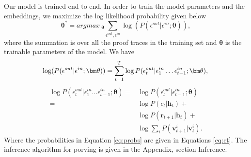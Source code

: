 Our model is trained end-to-end. In order to train the model parameters and the embeddings, we maximize the log likelihood probability given below
\begin{equation}
    {\bm \theta}^* = argmax~_{{\bm \theta}} \sum_{\epsilon^{out}, \epsilon^{in}} \log(P(\epsilon^{out} \vert \epsilon^{in};{\bm \theta})),
\end{equation}
where the summation is over all the proof traces in the training set and ${\bm \theta}$ is the trainable parameters of the model. We have
\begin{equation}
    \log(P(\epsilon^{out} \vert \epsilon^{in};{\bm \theta})) = \sum_{t=1}^T \log P(\epsilon^{out}_t \vert \epsilon^{in}_1 \dots \epsilon^{in}_{t-1}; {\bm \theta}), \\
\end{equation}
\begin{align}
    \log P(\epsilon^{out}_t \vert \epsilon^{in}_1 \dots \epsilon^{in}_{t-1}; {\bm \theta}) = & \log P(\epsilon^{out}_t \vert \epsilon^{in}_{t-1}; {\bm \theta}) \nonumber \\ 
     = & \log P(c_{t}\vert \mathbf{h}_t) +  \label{eq:probs}  \nonumber \\
     & \log P(\mathbf{r}_{t+1}\vert \mathbf{h}_t) + \nonumber \\
     & \log \sum_{i} P(\mathbf{v}^i_{t+1}\vert \mathbf{v}^i_t).
\end{align} 
Where the probabilities in Equation \eqref{eq:probs} are given in Equations  \eqref{eq:ct}. The inference algorithm for porving is given in the Appendix, section Inference. %
